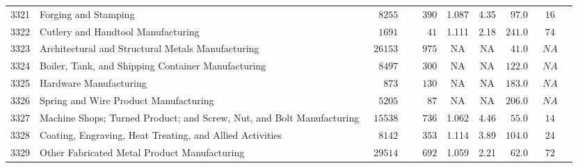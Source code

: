 \documentclass[9pt, oneside]{article}   	%
\begin{document}
\begin{longtable}{lp{3 in}ccccccc}
3321  & Forging and Stamping & $\phantom{00}8255$ & $\phantom{000}390$ & 1.087 &  4.35 & $\phantom{0}97.0$ & $\phantom{0}16$ \\
3322  & Cutlery and Handtool Manufacturing & $\phantom{00}1691$ & $\phantom{0000}41$ & 1.111 &  2.18 & $241.0$ & $\phantom{0}74$ \\
3323  & Architectural and Structural Metals Manufacturing & $\phantom{0}26153$ & $\phantom{000}975$ &    NA &    NA & $\phantom{0}41.0$ & $\phantom{0}NA$ \\
3324  & Boiler, Tank, and Shipping Container Manufacturing & $\phantom{00}8497$ & $\phantom{000}300$ &    NA &    NA & $122.0$ & $\phantom{0}NA$ \\
3325  & Hardware Manufacturing & $\phantom{000}873$ & $\phantom{000}130$ &    NA &    NA & $183.0$ & $\phantom{0}NA$ \\
3326  & Spring and Wire Product Manufacturing & $\phantom{00}5205$ & $\phantom{0000}87$ &    NA &    NA & $206.0$ & $\phantom{0}NA$ \\
3327  & Machine Shops; Turned Product; and Screw, Nut, and Bolt Manufacturing & $\phantom{0}15538$ & $\phantom{000}736$ & 1.062 &  4.46 & $\phantom{0}55.0$ & $\phantom{0}14$ \\
3328  & Coating, Engraving, Heat Treating, and Allied Activities & $\phantom{00}8142$ & $\phantom{000}353$ & 1.114 &  3.89 & $104.0$ & $\phantom{0}24$ \\
3329  & Other Fabricated Metal Product Manufacturing & $\phantom{0}29514$ & $\phantom{000}692$ & 1.059 &  2.21 & $\phantom{0}62.0$ & $\phantom{0}72$ \\


\end{longtable}
\end{document}
